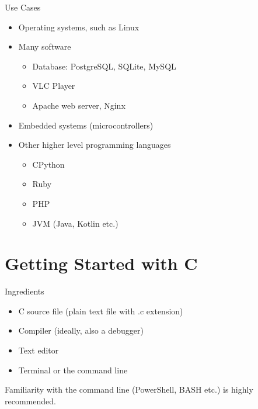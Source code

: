 \documentclass[12pt, aspectratio=169]{beamer}
\begin{document}
    \begin{frame}{Use Cases}
        \begin{itemize}
            \item Operating systems, such as Linux
            \item Many software
            \begin{itemize}
                \item Database: PostgreSQL, SQLite, MySQL
                \item VLC Player
                \item Apache web server, Nginx
            \end{itemize}
            \item Embedded systems (microcontrollers)
            \item Other higher level programming languages
            \begin{itemize}
                \item CPython
                \item Ruby
                \item PHP
                \item JVM (Java, Kotlin etc.)
            \end{itemize}
        \end{itemize}
    \end{frame}


    \section{Getting Started with C}

    \begin{frame}{Ingredients}
        \begin{itemize}
            \item C source file (plain text file with .c extension)
            \item Compiler (ideally, also a debugger)
            \item Text editor
            \item Terminal or the command line
        \end{itemize}

        Familiarity with the command line (PowerShell, BASH etc.) is highly recommended.
    \end{frame}
\end{document}
